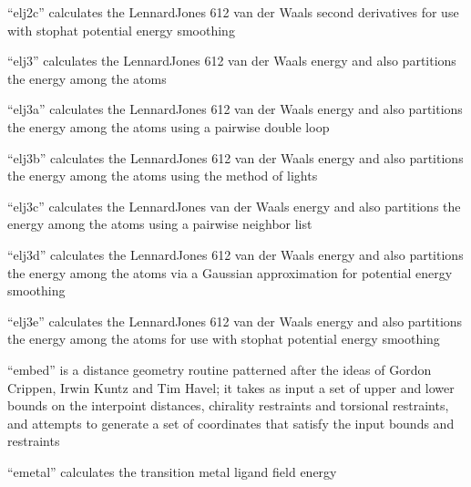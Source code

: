 \documentclass[letterpaper,11pt,english]{sphinxmanual}
\begin{document}
“elj2c” calculates the Lennard\sphinxhyphen{}Jones 6\sphinxhyphen{}12 van der Waals second
derivatives for use with stophat potential energy smoothing


“elj3” calculates the Lennard\sphinxhyphen{}Jones 6\sphinxhyphen{}12 van der Waals energy
and also partitions the energy among the atoms


“elj3a” calculates the Lennard\sphinxhyphen{}Jones 6\sphinxhyphen{}12 van der Waals
energy and also partitions the energy among the atoms using
a pairwise double loop


“elj3b” calculates the Lennard\sphinxhyphen{}Jones 6\sphinxhyphen{}12 van der Waals
energy and also partitions the energy among the atoms using
the method of lights


“elj3c” calculates the Lennard\sphinxhyphen{}Jones van der Waals energy
and also partitions the energy among the atoms using a
pairwise neighbor list


“elj3d” calculates the Lennard\sphinxhyphen{}Jones 6\sphinxhyphen{}12 van der Waals energy
and also partitions the energy among the atoms via a Gaussian
approximation for potential energy smoothing


“elj3e” calculates the Lennard\sphinxhyphen{}Jones 6\sphinxhyphen{}12 van der Waals energy
and also partitions the energy among the atoms for use with
stophat potential energy smoothing


“embed” is a distance geometry routine patterned after the
ideas of Gordon Crippen, Irwin Kuntz and Tim Havel; it takes
as input a set of upper and lower bounds on the interpoint
distances, chirality restraints and torsional restraints,
and attempts to generate a set of coordinates that satisfy
the input bounds and restraints


“emetal” calculates the transition metal ligand field energy

\end{document}
